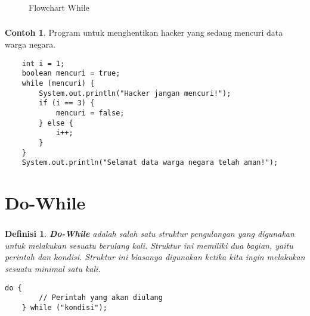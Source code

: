 \documentclass[aspectratio=169]{beamer}
\newtheorem*{definisi}{Definisi}
\theoremstyle{definition}
\newtheorem*{contoh}{Contoh}
\begin{document}
    \begin{frame}
        \frametitle{\insertsection}
        \begin{figure}
            \centering
            \caption{Flowchart While}
        \end{figure}
    \end{frame}

    \begin{frame}[fragile]
        \frametitle{\insertsection}
        \begin{contoh}
            Program untuk menghentikan hacker yang sedang mencuri data warga negara.
        \end{contoh}
        \begin{lstlisting}
    int i = 1;
    boolean mencuri = true;
    while (mencuri) {
        System.out.println("Hacker jangan mencuri!");
        if (i == 3) {
            mencuri = false;
        } else {
            i++;
        }
    }
    System.out.println("Selamat data warga negara telah aman!");
        \end{lstlisting}
    \end{frame}

    \section{Do-While}
    \begin{frame}[fragile]
        \frametitle{\insertsection}
        \begin{definisi}
            \textbf{Do-While} adalah salah satu struktur pengulangan yang digunakan untuk melakukan sesuatu berulang kali. Struktur ini memiliki dua bagian, yaitu perintah dan kondisi. Struktur ini biasanya digunakan ketika kita ingin melakukan sesuatu minimal satu kali.
        \end{definisi}
        \begin{lstlisting}[caption={Syntax Do-While}, numbers=none]
    do {
        // Perintah yang akan diulang
    } while ("kondisi");
        \end{lstlisting}
    \end{frame}
\end{document}
